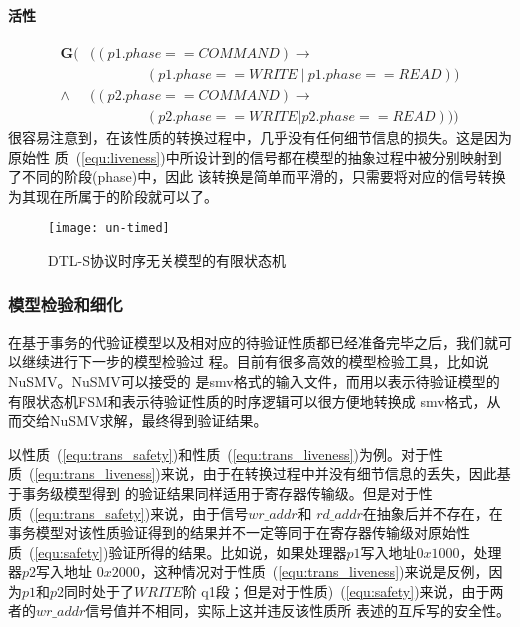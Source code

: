 \begin{enumerate}
 \paragraph{活性}
  \begin{equation} \label{equ:trans_liveness}
    \begin{split}
      \mathbf{G}(&((p1.phase == COMMAND) \rightarrow \\
      & \qquad\qquad(p1.phase == WRITE\ |\ p1.phase == READ))\\
      \wedge &((p2.phase == COMMAND) \rightarrow \\
      & \qquad\qquad(p2.phase == WRITE | p2.phase == READ)))
    \end{split}
  \end{equation}
  很容易注意到，在该性质的转换过程中，几乎没有任何细节信息的损失。这是因为原始性
  质~(\ref{equ:liveness})中所设计到的信号都在模型的抽象过程中被分别映射到了不同的阶段(phase)中，因此
  该转换是简单而平滑的，只需要将对应的信号转换为其现在所属于的阶段就可以了。
\end{enumerate}

\begin{figure}[ht]
  \centering
  \texttt{[image: un-timed]}
  \caption{DTL-S协议时序无关模型的有限状态机}
  \label{fig:un-timed}
\end{figure} 

\subsubsection{模型检验和细化}
\label{sec:model_checking_refinement}
在基于事务的代验证模型以及相对应的待验证性质都已经准备完毕之后，我们就可以继续进行下一步的模型检验过
程。目前有很多高效的模型检验工具，比如说NuSMV\cite{DBLP:conf/cav/CimattiCGGPRST02}。NuSMV可以接受的
是smv格式的输入文件，而用以表示待验证模型的有限状态机FSM和表示待验证性质的时序逻辑可以很方便地转换成
smv格式，从而交给NuSMV求解，最终得到验证结果。


以性质~(\ref{equ:trans_safety})和性质~(\ref{equ:trans_liveness})为例。对于性
质~(\ref{equ:trans_liveness})来说，由于在转换过程中并没有细节信息的丢失，因此基于事务级模型得到
的验证结果同样适用于寄存器传输级。但是对于性质~(\ref{equ:trans_safety})来说，由于信号$wr\_addr$和
$rd\_addr$在抽象后并不存在，在事务模型对该性质验证得到的结果并不一定等同于在寄存器传输级对原始性
质~(\ref{equ:safety})验证所得的结果。比如说，如果处理器$p1$写入地址$0x1000$，处理器$p2$写入地址
$0x2000$，这种情况对于性质~(\ref{equ:trans_liveness})来说是反例，因为$p1$和$p2$同时处于了$WRITE$阶
q1段；但是对于性质)~(\ref{equ:safety})来说，由于两者的$wr\_addr$信号值并不相同，实际上这并违反该性质所
表述的互斥写的安全性。

